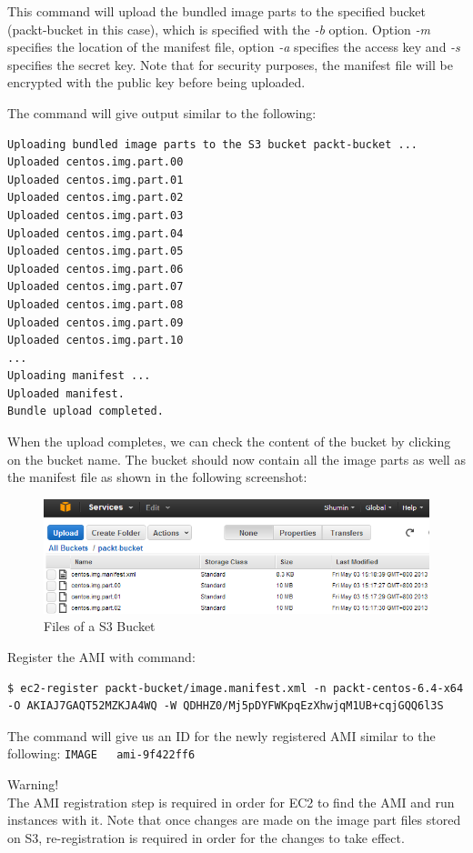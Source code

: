 This command will upload the bundled image parts to the specified bucket (packt-bucket in this case), which is specified with the \emph{-b} option. Option \emph{-m} specifies the location of the manifest file, option \emph{-a} specifies the access key and \emph{-s} specifies the secret key. Note that for security purposes, the manifest file will be encrypted with the public key before being uploaded.

The command will give output similar to the following:
\lstset{style=bashstyle}
\begin{lstlisting}
Uploading bundled image parts to the S3 bucket packt-bucket ...
Uploaded centos.img.part.00
Uploaded centos.img.part.01
Uploaded centos.img.part.02
Uploaded centos.img.part.03
Uploaded centos.img.part.04
Uploaded centos.img.part.05
Uploaded centos.img.part.06
Uploaded centos.img.part.07
Uploaded centos.img.part.08
Uploaded centos.img.part.09
Uploaded centos.img.part.10
...
Uploading manifest ...
Uploaded manifest.
Bundle upload completed.
\end{lstlisting}

When the upload completes, we can check the content of the bucket by clicking on the bucket name. The bucket should now contain all the image parts as well as the manifest file as shown in the following screenshot:
\begin{figure}[ht]
  \centering
  \includegraphics[width=.8\textwidth]{figs/5163os_08_20.png}
  \caption{Files of a S3 Bucket}\label{fig:aws.bucket.content}
\end{figure} 
Register the AMI with command:
\lstset{style=bashstyle}
\begin{lstlisting}
$ ec2-register packt-bucket/image.manifest.xml -n packt-centos-6.4-x64 -O AKIAJ7GAQT52MZKJA4WQ -W QDHHZ0/Mj5pDYFWKpqEzXhwjqM1UB+cqjGQQ6l3S
\end{lstlisting}

The command will give us an ID for the newly registered AMI similar to the following:
\verb|IMAGE   ami-9f422ff6|
\begin{warning}
Warning!\\
The AMI registration step is required in order for EC2 to find the AMI and run instances with it. Note that once changes are made on the image part files stored on S3, re-registration is required in order for the changes to take effect.
\end{warning}

